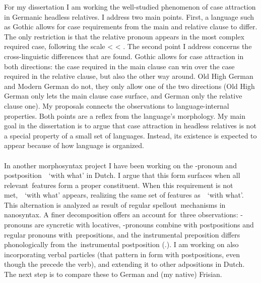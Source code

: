 \documentclass[12pt]{article}
\begin{document}
For my dissertation I am working the well-studied phenomenon of case attraction in Germanic headless relatives. I address two main points. First, a language such as Gothic allows for case requirements from the main and relative clause to differ. The only restriction is that the relative pronoun appears in the most complex required case, following the scale  <  < . The second point I address concerns the cross-linguistic differences that are found. Gothic allows for case attraction in both directions: the case required in the main clause can win over the case required in the relative clause, but also the other way around. Old High German and Modern German do not, they only allow one of the two directions (Old High German only lets the main clause case surface, and German only the relative clause one). My proposals connects the observations to language-internal properties. Both points are a reflex from the language’s morphology. My main goal in the dissertation is to argue that case attraction in headless relatives is not a special property of a small set of languages. Instead, its existence is expected to appear because of how language is organized.\\

\phantom{x}\\

In another morphosyntax project I have been working on the -pronoun and postposition  `with what’ in Dutch. I argue that this form surfaces when all relevant features form a proper constituent. When this requirement is not met,  `with what’ appears, realizing the same set of features as  `with what'. This alternation is analyzed as result of regular spellout mechanisms in nanosyntax. A finer decomposition offers an account for three observations: -pronouns are syncretic with locatives, -pronouns combine with postpositions and regular pronouns with prepositions, and the instrumental preposition differs phonologically from the instrumental postposition (.). I am working on also incorporating verbal particles (that pattern in form with postpositions, even though the precede the verb), and extending it to other adpositions in Dutch. The next step is to compare these to German and (my native) Frisian.\\

\phantom{x}\\
\end{document}
